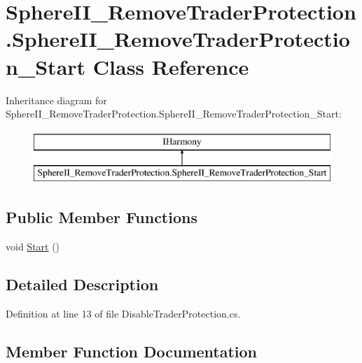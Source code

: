 \hypertarget{class_sphere_i_i___remove_trader_protection_1_1_sphere_i_i___remove_trader_protection___start}{}\section{Sphere\+I\+I\+\_\+\+Remove\+Trader\+Protection.\+Sphere\+I\+I\+\_\+\+Remove\+Trader\+Protection\+\_\+\+Start Class Reference}
\label{class_sphere_i_i___remove_trader_protection_1_1_sphere_i_i___remove_trader_protection___start}
Inheritance diagram for Sphere\+I\+I\+\_\+\+Remove\+Trader\+Protection.\+Sphere\+I\+I\+\_\+\+Remove\+Trader\+Protection\+\_\+\+Start\+:\begin{figure}[H]
\begin{center}
\leavevmode
\includegraphics[height=2.000000cm]{dc/da6/class_sphere_i_i___remove_trader_protection_1_1_sphere_i_i___remove_trader_protection___start}
\end{center}
\end{figure}
\subsection*{Public Member Functions}
\begin{DoxyCompactItemize}
\item 
void \mbox{\hyperlink{class_sphere_i_i___remove_trader_protection_1_1_sphere_i_i___remove_trader_protection___start_a9be164eec70f59a759562569cb822a31}{Start}} ()
\end{DoxyCompactItemize}


\subsection{Detailed Description}


Definition at line 13 of file Disable\+Trader\+Protection.\+cs.



\subsection{Member Function Documentation}
\mbox{\label{class_sphere_i_i___remove_trader_protection_1_1_sphere_i_i___remove_trader_protection___start_a9be164eec70f59a759562569cb822a31}} 
